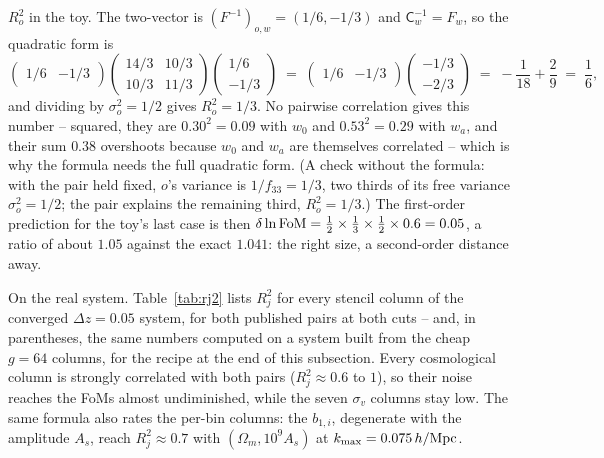 \documentclass[11pt]{article}
\newcommand{\Cov}{\mathsf{C}}
\newcommand{\kmax}{k_{\rm max}}
\newcommand{\hMpc}{\,h/{\rm Mpc}}
\begin{document}
$R_o^2$ in the toy.  The two-vector is $(F^{-1})_{o,w} = (1/6, -1/3)$
and $\Cov_w^{-1} = F_w$, so the quadratic form is
\begin{equation*}
  \begin{pmatrix} 1/6 & -1/3 \end{pmatrix}
  \begin{pmatrix} 14/3 & 10/3 \\ 10/3 & 11/3 \end{pmatrix}
  \begin{pmatrix} 1/6 \\ -1/3 \end{pmatrix}
  \;=\;
  \begin{pmatrix} 1/6 & -1/3 \end{pmatrix}
  \begin{pmatrix} -1/3 \\ -2/3 \end{pmatrix}
  \;=\; -\frac{1}{18} + \frac{2}{9}
  \;=\; \frac{1}{6} ,
\end{equation*}
and dividing by $\sigma_o^2 = 1/2$ gives $R_o^2 = 1/3$.  No pairwise
correlation gives this number -- squared, they are $0.30^2 = 0.09$
with $w_0$ and $0.53^2 = 0.29$ with $w_a$, and their sum $0.38$
overshoots because $w_0$ and $w_a$ are themselves correlated -- which
is why the formula needs the full quadratic form.  (A check without
the formula: with the pair held fixed, $o$'s variance is
$1/f_{33} = 1/3$, two thirds of its free variance $\sigma_o^2 = 1/2$;
the pair explains the remaining third, $R_o^2 = 1/3$.)  The
first-order prediction for the toy's last case is then
$\delta\ln{\rm FoM} = \tfrac{1}{2} \times \tfrac{1}{3} \times
\tfrac{1}{2} \times 0.6 = 0.05$, a ratio of about $1.05$ against the
exact $1.041$: the right size, a second-order distance away.

On the real system.  Table~\ref{tab:rj2} lists $R_j^2$ for every
stencil column of the converged $\Delta z = 0.05$ system, for both
published pairs at both cuts -- and, in parentheses, the same
numbers computed on a system built from the cheap $g = 64$ columns,
for the recipe at the end of this subsection.  Every cosmological column is strongly
correlated with both pairs ($R_j^2 \approx 0.6$ to $1$), so their
noise reaches the FoMs almost undiminished, while the seven
$\sigma_v$ columns stay low.  The same formula also rates the
per-bin columns: the $b_{1,i}$, degenerate with the amplitude $A_s$,
reach $R_j^2 \approx 0.7$ with $(\Omega_m, 10^9 A_s)$ at
$\kmax = 0.075\hMpc$.
\end{document}
